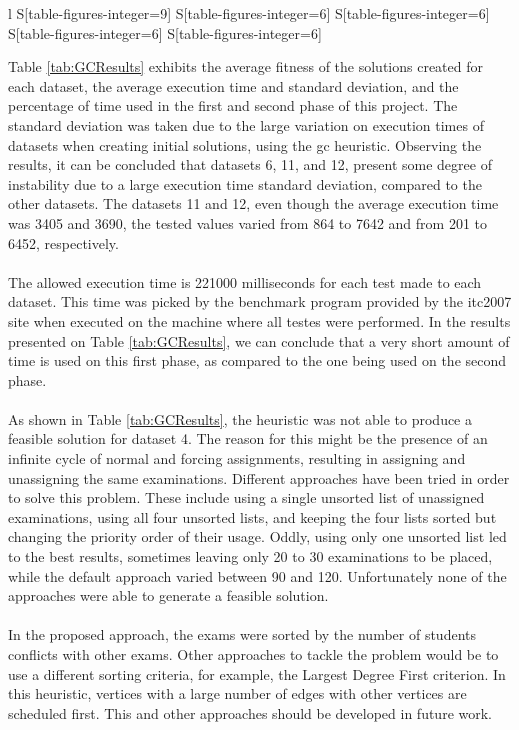\begin{table}[t]
\begin{tabular}{%
	 l%
     S[table-figures-integer=9]%
     S[table-figures-integer=6]%
     S[table-figures-integer=6]%
     S[table-figures-integer=6]%
     S[table-figures-integer=6]%
    }
\bottomrule

\end{tabular}
\label{tab:GCResults}

\end{table}Table \ref{tab:GCResults} exhibits the average fitness of the solutions created for each dataset, the average execution time and standard deviation, and the percentage of time used in the first and second phase of this project. The standard deviation was taken due to the large variation on execution times of datasets when creating initial solutions, using the \gls{gc} heuristic. Observing the results, it can be concluded that datasets 6, 11, and 12, present some degree of instability due to a large execution time standard deviation, compared to the other datasets. The datasets 11 and 12, even though the average execution time was 3405 and 3690, the tested values varied from 864 to 7642 and from 201 to 6452, respectively.\\
\\
The allowed execution time is 221000 milliseconds for each test made to each dataset. This time was picked by the benchmark program provided by the \gls{itc2007} site \cite{McCollum2007e} when executed on the machine where all testes were performed. In the results presented on Table \ref{tab:GCResults}, we can conclude that a very short amount of time is used on this first phase, as compared to the one being used on the second phase.\\
\\
As shown in Table \ref{tab:GCResults}, the heuristic was not able to produce a feasible solution for dataset 4. The reason for this might be the presence of an infinite cycle of normal and forcing assignments, resulting in assigning and unassigning the same examinations. Different approaches have been tried in order to solve this problem. These include using a single unsorted list of unassigned examinations, using all four unsorted lists, and keeping the four lists sorted but changing the priority order of their usage. Oddly, using only one unsorted list led to the best results, sometimes leaving only 20 to 30 examinations to be placed, while the default approach varied between 90 and 120. Unfortunately none of the approaches were able to generate a feasible solution.\\
\\
In the proposed approach, the exams were sorted by the number of students conflicts with other exams. Other approaches to tackle the problem would be to use a different sorting criteria, for example, the Largest Degree First criterion. In this heuristic, vertices with a large number of edges with other vertices  are scheduled first. This and other approaches should be developed in future work.